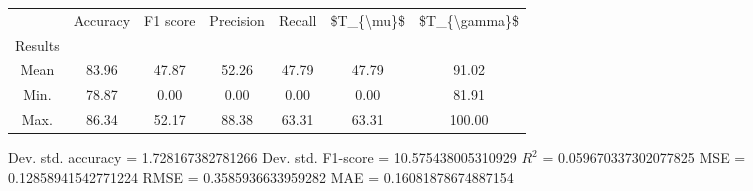\begin{tabular}{|c|c|c|c|c|c|c|}
\toprule
{} &  Accuracy &  F1 score &  Precision &  Recall &  \$T\_\{\textbackslash mu\}\$ &  \$T\_\{\textbackslash gamma\}\$ \\
Results &           &           &            &         &            &               \\
\hline
Mean    &     83.96 &     47.87 &      52.26 &   47.79 &      47.79 &         91.02 \\
Min.    &     78.87 &      0.00 &       0.00 &    0.00 &       0.00 &         81.91 \\
Max.    &     86.34 &     52.17 &      88.38 &   63.31 &      63.31 &        100.00 \\
\bottomrule
\end{tabular}

 Dev. std. accuracy = 1.728167382781266
 Dev. std. F1-score = 10.575438005310929
 $R^2$ = 0.059670337302077825
 MSE = 0.12858941542771224
 RMSE = 0.3585936633959282
 MAE = 0.16081878674887154